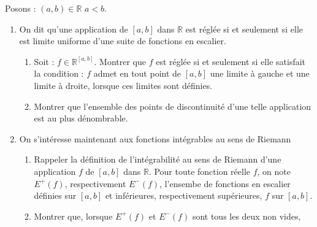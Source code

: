 
\begin{exer}
Posons : $(a,b) \in \mathbb{R}$ $a < b$.
\begin{enumerate}
\item On dit qu'une application de $[a,b]$ dans $\mathbb{R}$ est réglée si et seulement si %
elle est limite uniforme d'une suite de fonctions en escalier.
\begin{enumerate}
\item Soit : $f \in \mathbb{R}^{[a,b]}$. Montrer que $f$ est réglée si et seulement si elle satisfait la condition : %
$f$ admet en tout point de $[a,b]$ une limite à gauche et une limite à droite, lorsque ces limites sont définies.
\item Montrer que l'ensemble des points de discontinuité d'une telle application est au plus dénombrable.
\end{enumerate}
\item On s'int\'eresse maintenant aux fonctions int\'egrables au sens de Riemann
\begin{enumerate}
\item Rappeler la définition de l'intégrabilité au sens de Riemann d'une application $f$ de $[a,b]$ dans $\mathbb{R}$.
Pour toute fonction r\'eelle $f$, on note $E^+(f)$, respectivement $E^-(f)$, l'ensembe de fonctions en escalier d\'efinies sur $[a,b]$ et inf\'erieures, respectivement sup\'erieures,  $f$ sur $[a,b]$.
\item Montrer que, lorsque $E^+(f)$ et $E^-(f)$ sont tous les deux non vides, %

\end{enumerate}
\end{enumerate}
\end{exer}
